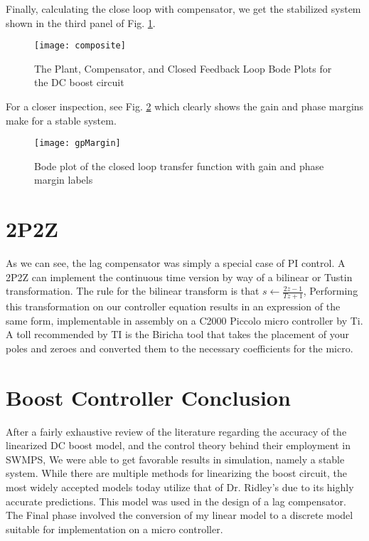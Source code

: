 Finally, calculating the close loop with compensator, we get the stabilized system shown in the third panel of Fig. \ref{composite}. 

\begin{figure}[htbp]
\begin{center}
\texttt{[image: composite]}
\caption{The Plant, Compensator, and Closed Feedback Loop Bode Plots for the DC boost circuit}
\label{composite}
\end{center}
\end{figure}

For a closer inspection, see Fig. \ref{gpMargin} which clearly shows the gain and phase margins make for a stable system. 

\begin{figure}[htbp]
\begin{center}
\texttt{[image: gpMargin]}
\caption{Bode plot of the closed loop transfer function with gain and phase margin labels}
\label{gpMargin}
\end{center}
\end{figure}

\section{2P2Z}
As we can see, the lag compensator was simply a special case of PI control. A 2P2Z can implement the continuous time version by way of a bilinear or Tustin transformation. The rule for the bilinear transform is that $s\leftarrow\frac{2z-1}{Tz+1}$, Performing this transformation on our controller equation results in an expression of the same form, implementable in assembly on a C2000 Piccolo micro controller by Ti. A toll recommended by TI is the Biricha tool that takes the placement of your poles and zeroes and converted them to the necessary coefficients for the micro.

\section{Boost Controller Conclusion}
After a fairly exhaustive review of the literature regarding the accuracy of the linearized DC boost model, and the control theory behind their employment in SWMPS, We were able to get favorable results in simulation, namely a stable system. While there are multiple methods for linearizing the boost circuit, the most widely accepted models today utilize that of Dr. Ridley's due to its highly accurate predictions. This model was used in the design of a lag compensator. The Final phase involved the conversion of my linear model to a discrete model suitable for implementation on a micro controller.